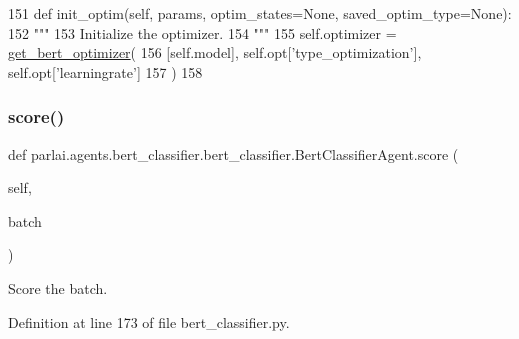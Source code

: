 \begin{DoxyCode}
151     \textcolor{keyword}{def }init\_optim(self, params, optim\_states=None, saved\_optim\_type=None):
152         \textcolor{stringliteral}{"""}
153 \textcolor{stringliteral}{        Initialize the optimizer.}
154 \textcolor{stringliteral}{        """}
155         self.optimizer = \hyperlink{namespaceparlai_1_1agents_1_1bert__ranker_1_1helpers_a7a144c1f6c9af7925e754b9b61c0e6fb}{get\_bert\_optimizer}(
156             [self.model], self.opt[\textcolor{stringliteral}{'type\_optimization'}], self.opt[\textcolor{stringliteral}{'learningrate'}]
157         )
158 
\end{DoxyCode}
\mbox{\label{classparlai_1_1agents_1_1bert__classifier_1_1bert__classifier_1_1BertClassifierAgent_a2fa163d78b44698fa35a491e9a7a6207}} 
\subsubsection{\texorpdfstring{score()}{score()}}
{\footnotesize\ttfamily def parlai.\+agents.\+bert\+\_\+classifier.\+bert\+\_\+classifier.\+Bert\+Classifier\+Agent.\+score (\begin{DoxyParamCaption}\item[{}]{self,  }\item[{}]{batch }\end{DoxyParamCaption})}

\begin{DoxyVerb}Score the batch.
\end{DoxyVerb}
 

Definition at line 173 of file bert\+\_\+classifier.\+py.



